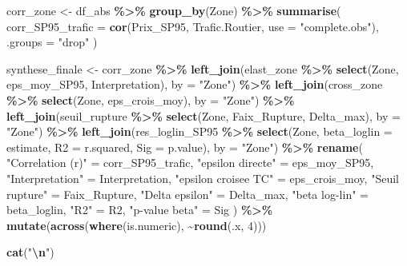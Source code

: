 \documentclass[
]{article}
\newenvironment{Shaded}{\begin{snugshade}}{\end{snugshade}}
\newcommand{\AttributeTok}[1]{\textcolor[rgb]{0.13,0.29,0.53}{#1}}
\newcommand{\DecValTok}[1]{\textcolor[rgb]{0.00,0.00,0.81}{#1}}
\newcommand{\FunctionTok}[1]{\textcolor[rgb]{0.13,0.29,0.53}{\textbf{#1}}}
\newcommand{\NormalTok}[1]{#1}
\newcommand{\OtherTok}[1]{\textcolor[rgb]{0.56,0.35,0.01}{#1}}
\newcommand{\SpecialCharTok}[1]{\textcolor[rgb]{0.81,0.36,0.00}{\textbf{#1}}}
\newcommand{\StringTok}[1]{\textcolor[rgb]{0.31,0.60,0.02}{#1}}
\begin{document}
\begin{Shaded}
\begin{Highlighting}[]
\NormalTok{corr\_zone }\OtherTok{\textless{}{-}}\NormalTok{ df\_abs }\SpecialCharTok{\%\textgreater{}\%}
  \FunctionTok{group\_by}\NormalTok{(Zone) }\SpecialCharTok{\%\textgreater{}\%}
  \FunctionTok{summarise}\NormalTok{(}
    \AttributeTok{corr\_SP95\_trafic =} \FunctionTok{cor}\NormalTok{(Prix\_SP95, Trafic.Routier, }\AttributeTok{use =} \StringTok{"complete.obs"}\NormalTok{),}
    \AttributeTok{.groups =} \StringTok{"drop"}
\NormalTok{  )}
 
\NormalTok{synthese\_finale }\OtherTok{\textless{}{-}}\NormalTok{ corr\_zone }\SpecialCharTok{\%\textgreater{}\%}
  \FunctionTok{left\_join}\NormalTok{(elast\_zone     }\SpecialCharTok{\%\textgreater{}\%} \FunctionTok{select}\NormalTok{(Zone, eps\_moy\_SP95, Interpretation),           }\AttributeTok{by =} \StringTok{"Zone"}\NormalTok{) }\SpecialCharTok{\%\textgreater{}\%}
  \FunctionTok{left\_join}\NormalTok{(cross\_zone     }\SpecialCharTok{\%\textgreater{}\%} \FunctionTok{select}\NormalTok{(Zone, eps\_crois\_moy),                           }\AttributeTok{by =} \StringTok{"Zone"}\NormalTok{) }\SpecialCharTok{\%\textgreater{}\%}
  \FunctionTok{left\_join}\NormalTok{(seuil\_rupture  }\SpecialCharTok{\%\textgreater{}\%} \FunctionTok{select}\NormalTok{(Zone, Faix\_Rupture, Delta\_max),                 }\AttributeTok{by =} \StringTok{"Zone"}\NormalTok{) }\SpecialCharTok{\%\textgreater{}\%}
  \FunctionTok{left\_join}\NormalTok{(res\_loglin\_SP95 }\SpecialCharTok{\%\textgreater{}\%} \FunctionTok{select}\NormalTok{(Zone, }\AttributeTok{beta\_loglin =}\NormalTok{ estimate,}
                                        \AttributeTok{R2 =}\NormalTok{ r.squared, }\AttributeTok{Sig =}\NormalTok{ p.value),             }\AttributeTok{by =} \StringTok{"Zone"}\NormalTok{) }\SpecialCharTok{\%\textgreater{}\%}
  \FunctionTok{rename}\NormalTok{(}
    \StringTok{"Correlation (r)"}    \OtherTok{=}\NormalTok{ corr\_SP95\_trafic,}
    \StringTok{"epsilon directe"}    \OtherTok{=}\NormalTok{ eps\_moy\_SP95,}
    \StringTok{"Interpretation"}     \OtherTok{=}\NormalTok{ Interpretation,}
    \StringTok{"epsilon croisee TC"} \OtherTok{=}\NormalTok{ eps\_crois\_moy,}
    \StringTok{"Seuil rupture"}      \OtherTok{=}\NormalTok{ Faix\_Rupture,}
    \StringTok{"Delta epsilon"}      \OtherTok{=}\NormalTok{ Delta\_max,}
    \StringTok{"beta log{-}lin"}       \OtherTok{=}\NormalTok{ beta\_loglin,}
    \StringTok{"R2"}                 \OtherTok{=}\NormalTok{ R2,}
    \StringTok{"p{-}value beta"}       \OtherTok{=}\NormalTok{ Sig}
\NormalTok{  ) }\SpecialCharTok{\%\textgreater{}\%}
  \FunctionTok{mutate}\NormalTok{(}\FunctionTok{across}\NormalTok{(}\FunctionTok{where}\NormalTok{(is.numeric), }\SpecialCharTok{\textasciitilde{}}\FunctionTok{round}\NormalTok{(.x, }\DecValTok{4}\NormalTok{)))}
 
\FunctionTok{cat}\NormalTok{(}\StringTok{"}\SpecialCharTok{\textbackslash{}n}\StringTok{"}\NormalTok{)}
\end{Highlighting}
\end{Shaded}
\end{document}
